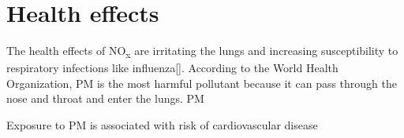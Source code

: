 \section{Health effects}

 The health effects of NO\textsubscript{x} are irritating the lungs and increasing susceptibility to respiratory infections like influenza[].
 According to the World Health Organization, PM is the most harmful pollutant because it can pass through the nose and throat and enter the lungs. PM 
 
Exposure to PM is associated with risk of cardiovascular disease \cite{Polichetti2009EffectsSystem}

